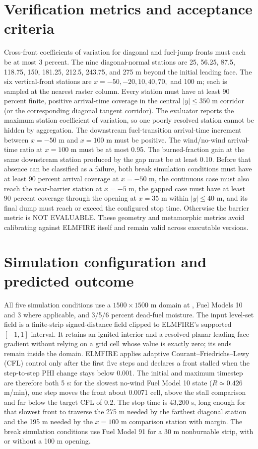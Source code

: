 \section{Verification metrics and acceptance criteria}

Cross-front coefficients of variation for diagonal and fuel-jump fronts must each be at most 3 percent. The nine diagonal-normal stations are 25, 56.25, 87.5, 118.75, 150, 181.25, 212.5, 243.75, and 275 m beyond the initial leading face. The six vertical-front stations are $x=-50,-20,10,40,70,$ and 100 m; each is sampled at the nearest raster column. Every station must have at least 90 percent finite, positive arrival-time coverage in the central $|y|\le350$ m corridor (or the corresponding diagonal tangent corridor). The evaluator reports the maximum station coefficient of variation, so one poorly resolved station cannot be hidden by aggregation. The downstream fuel-transition arrival-time increment between $x=-50$ m and $x=100$ m must be positive. The wind/no-wind arrival-time ratio at $x=100$ m must be at most 0.95. The burned-fraction gain at the same downstream station produced by the gap must be at least 0.10. Before that absence can be classified as a failure, both break simulation conditions must have at least 90 percent arrival coverage at $x=-50$ m, the continuous case must also reach the near-barrier station at $x=-5$ m, the gapped case must have at least 90 percent coverage through the opening at $x=35$ m within $|y|\le40$ m, and its final dump must reach or exceed the configured stop time. Otherwise the barrier metric is NOT EVALUABLE. These geometry and metamorphic metrics avoid calibrating against ELMFIRE itself and remain valid across executable versions.

\section{Simulation configuration and predicted outcome}

All five simulation conditions use a $1500\times1500$ m domain at \CellSize{}, Fuel Models 10 and 3 where applicable, and 3/5/6 percent dead-fuel moisture. The input level-set field is a finite-strip signed-distance field clipped to ELMFIRE's supported $[-1,1]$ interval. It retains an ignited interior and a resolved planar leading-face gradient without relying on a grid cell whose value is exactly zero; its ends remain inside the domain. ELMFIRE applies adaptive Courant--Friedrichs--Lewy (CFL) control only after the first five steps and declares a front stalled when the step-to-step PHI change stays below 0.001. The initial and maximum timestep are therefore both 5 s: for the slowest no-wind Fuel Model 10 state ($R\simeq0.426$ m/min), one step moves the front about 0.0071 cell, above the stall comparison and far below the target CFL of 0.2. The stop time is 43,200 s, long enough for that slowest front to traverse the 275 m needed by the farthest diagonal station and the 195 m needed by the $x=100$ m comparison station with margin. The break simulation conditions use Fuel Model 91 for a 30 m nonburnable strip, with or without a 100 m opening.

